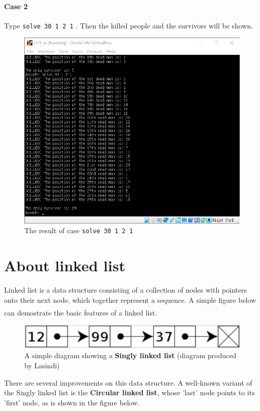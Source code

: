 \documentclass[cn,black,12pt,normal]{elegantnote}
\newcommand{\uct}[1]{\textsuperscript{\textsuperscript{\cite{#1}}}}
\begin{document}
\paragraph{Case 2} Type \lstinline{solve 30 1 2 1} . Then the killed people and the survivors will be shown.

\begin{figure}[H]
    \centering
    \includegraphics[width=0.7\linewidth]{image/j04.jpg}
    \caption{The result of case \lstinline{solve 30 1 2 1}}
\end{figure}

\section{About linked list}

Linked list is a data structure consisting of a collection of nodes with pointers onto their next node, which together represent a sequence. A simple figure below can demostrate the basic features of a linked list. \uct{wiki:Linked_list}

\begin{figure}[H]
    \centering
    \includegraphics[width=1.0\linewidth]{image/ll_01.jpg}
    \caption{A simple diagram showing a \textbf{Singly linked list} (diagram produced by Lasindi)}
\end{figure}

There are several improvements on this data structure. A well-known variant of the Singly linked list is the \textbf{Circular linked list}, whose 'last' node points to its 'first' node, as is shown in the figure below.
\end{document}
